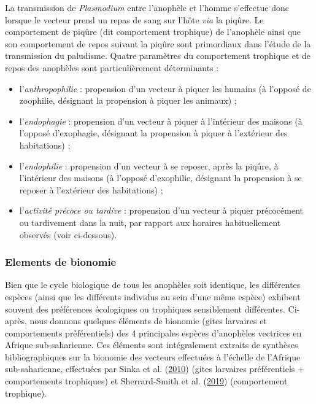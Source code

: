 \documentclass[12pt,twoside]{reedthesis}
\providecommand{\tightlist}{%
  \setlength{\itemsep}{0pt}\setlength{\parskip}{0pt}}
\begin{document}
La transmission de \emph{Plasmodium} entre l'anophèle et l'homme s'effectue donc lorsque le vecteur prend un repas de sang sur l'hôte \emph{via} la piqûre. Le comportement de piqûre (dit comportement trophique) de l'anophèle ainsi que son comportement de repos suivant la piqûre sont primordiaux dans l'étude de la transmission du paludisme. Quatre paramètres du comportement trophique et de repos des anophèles sont particulièrement déterminants :
\begin{itemize}
\tightlist
\item
  l'\emph{anthropophilie} : propension d'un vecteur à piquer les humains (à l'opposé de zoophilie, désignant la propension à piquer les animaux) ;
\item
  l'\emph{endophagie} : propension d'un vecteur à piquer à l'intérieur des maisons (à l'opposé d'exophagie, désignant la propension à piquer à l'extérieur des habitations) ;
\item
  l'\emph{endophilie} : propension d'un vecteur à se reposer, après la piqûre, à l'intérieur des maisons (à l'opposé d'exophilie, désignant la propension à se reposer à l'extérieur des habitations) ;
\item
  l'\emph{activité précoce ou tardive} : propension d'un vecteur à piquer précocément ou tardivement dans la nuit, par rapport aux horaires habituellement observés (voir ci-dessous).\\
\end{itemize}
\hypertarget{elements-de-bionomie}{%
\subsubsection{Elements de bionomie}\label{elements-de-bionomie}}

Bien que le cycle biologique de tous les anophèles soit identique, les différentes espèces (ainsi que les différents individus au sein d'une même espèce) exhibent souvent des préférences écologiques ou trophiques sensiblement différentes. Ci-après, nous donnons quelques éléments de bionomie (gites larvaires et comportements préférentiels) des 4 principales espèces d'anophèles vectrices en Afrique sub-saharienne. Ces éléments sont intégralement extraits de synthèses bibliographiques sur la bionomie des vecteurs effectuées à l'échelle de l'Afrique sub-saharienne, effectuées par Sinka et al. (\protect\hyperlink{ref-sinka_dominant_2010}{2010}) (gites larvaires préférentiels + comportements trophiques) et Sherrard-Smith et al. (\protect\hyperlink{ref-sherrard-smith_mosquito_2019}{2019}) (comportement trophique).\\
\end{document}
